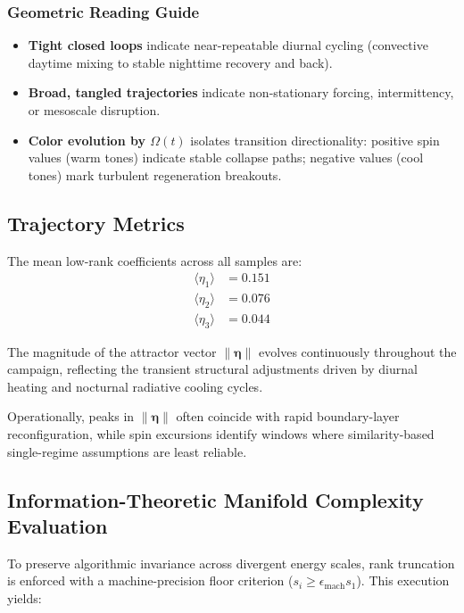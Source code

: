\documentclass[11pt,a4paper]{article}
\begin{document}
\subsubsection{Geometric Reading Guide}
\begin{itemize}
    \item \textbf{Tight closed loops} indicate near-repeatable diurnal cycling (convective daytime mixing to stable nighttime recovery and back).
    \item \textbf{Broad, tangled trajectories} indicate non-stationary forcing, intermittency, or mesoscale disruption.
    \item \textbf{Color evolution by $\Omega(t)$} isolates transition directionality: positive spin values (warm tones) indicate stable collapse paths; negative values (cool tones) mark turbulent regeneration breakouts.
\end{itemize}

\subsection{Trajectory Metrics}

The mean low-rank coefficients across all samples are:
\begin{align}
    \langle \eta_1 \rangle &= 0.151 \\
    \langle \eta_2 \rangle &= 0.076 \\
    \langle \eta_3 \rangle &= 0.044
\end{align}

The magnitude of the attractor vector $\|\boldsymbol{\eta}\|$ evolves continuously throughout the campaign, reflecting the transient structural adjustments driven by diurnal heating and nocturnal radiative cooling cycles.

Operationally, peaks in $\|\boldsymbol{\eta}\|$ often coincide with rapid boundary-layer reconfiguration, while spin excursions identify windows where similarity-based single-regime assumptions are least reliable.

\subsection{Information-Theoretic Manifold Complexity Evaluation}

To preserve algorithmic invariance across divergent energy scales, rank truncation is enforced with a machine-precision floor criterion ($s_i \ge \epsilon_{\text{mach}} s_1$). This execution yields:
\end{document}
